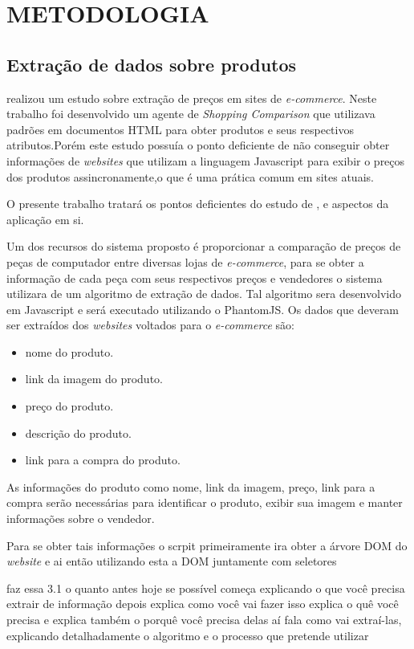 \section{METODOLOGIA}
\label{sec:metod}

\subsection{Extração de dados sobre produtos}

 realizou um estudo sobre extração de preços em sites de \emph{e-commerce}. Neste trabalho foi desenvolvido um agente de \emph{Shopping Comparison} que utilizava padrões em documentos HTML para obter produtos e seus respectivos atributos.Porém este estudo possuía o ponto deficiente de não conseguir obter informações de \emph{websites} que utilizam a linguagem Javascript para exibir o preços dos produtos assincronamente,o que é uma prática comum em sites atuais.

O presente trabalho tratará os pontos deficientes do estudo de , e aspectos da aplicação em si.

Um dos recursos do sistema proposto é proporcionar a comparação de preços de peças de computador entre diversas lojas de \emph{e-commerce}, para se obter a informação de cada peça com seus respectivos preços e vendedores o sistema utilizara de um algoritmo de extração de dados. Tal algoritmo sera desenvolvido em Javascript e será executado utilizando o PhantomJS.
Os dados que deveram ser extraídos dos \emph{websites} voltados para o \emph{e-commerce} são:

\cite{alonso2015agente}

\begin{itemize}
\setlength{\itemsep}{-0.3ex}
\item nome do produto.
\item link da imagem do produto.
\item preço do produto.
\item descrição do produto.
\item link para a compra do produto.
\end{itemize}


As informações do produto como nome, link da imagem, preço, link para a compra serão necessárias para identificar o produto, exibir sua imagem e manter informações sobre o vendedor.


Para se obter tais informações o scrpit primeiramente ira obter a árvore DOM do \emph{website} e ai então utilizando esta a DOM juntamente com seletores    


faz essa 3.1 o quanto antes
hoje se possível
começa explicando o que você precisa extrair de informação
depois explica como você vai fazer isso
explica o quê você precisa e explica também o porquê você precisa delas
aí fala como vai extraí-las, explicando detalhadamente o algoritmo e o processo que pretende utilizar
